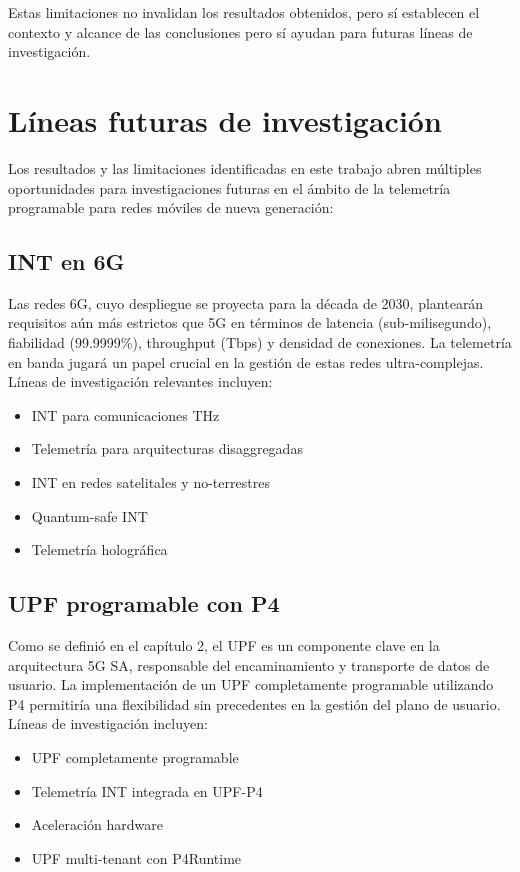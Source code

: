 Estas limitaciones no invalidan los resultados obtenidos, pero sí establecen el contexto y alcance de las conclusiones pero sí ayudan para futuras líneas de investigación.

\section{Líneas futuras de investigación}

Los resultados y las limitaciones identificadas en este trabajo abren múltiples oportunidades para investigaciones futuras en el ámbito de la telemetría programable para redes móviles de nueva generación:

\subsection{INT en 6G}

Las redes 6G, cuyo despliegue se proyecta para la década de 2030, plantearán requisitos aún más estrictos que 5G en términos de latencia (sub-milisegundo), fiabilidad (99.9999\%), throughput (Tbps) y densidad de conexiones. La telemetría en banda jugará un papel crucial en la gestión de estas redes ultra-complejas. Líneas de investigación relevantes incluyen:

\begin{itemize}
    \item INT para comunicaciones THz
    \item Telemetría para arquitecturas disaggregadas
    \item INT en redes satelitales y no-terrestres
    \item Quantum-safe INT
    \item Telemetría holográfica
\end{itemize}

\subsection{UPF programable con P4}
Como se definió en el capítulo 2, el UPF es un componente clave en la arquitectura 5G SA, responsable del encaminamiento y transporte de datos de usuario. La implementación de un UPF completamente programable utilizando P4 permitiría una flexibilidad sin precedentes en la gestión del plano de usuario. Líneas de investigación incluyen:

\begin{itemize}
    \item UPF completamente programable
    \item Telemetría INT integrada en UPF-P4
    \item Aceleración hardware
    \item UPF multi-tenant con P4Runtime
    \end{itemize}

